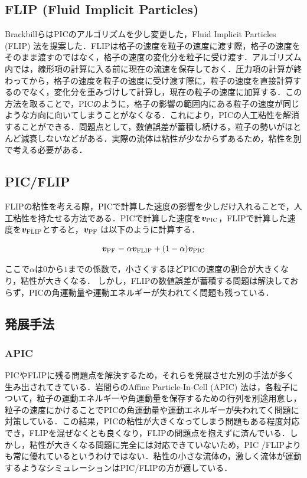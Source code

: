 \documentclass[a4j,12pt]{jreport}
\begin{document}
\subsection{FLIP (Fluid Implicit Particles) } \label{subsec:FLIP}
BrackbillらはPICのアルゴリズムを少し変更した，Fluid Implicit Particles (FLIP) 法\cite{FLIP}を提案した．FLIPは格子の速度を粒子の速度に渡す際，格子の速度をそのまま渡すのではなく，格子の速度の変化分を粒子に受け渡す．アルゴリズム内では，線形項の計算に入る前に現在の流速を保存しておく．圧力項の計算が終わってから，格子の速度を粒子の速度に受け渡す際に，粒子の速度を直接計算するのでなく，変化分を重みづけして計算し，現在の粒子の速度に加算する．この方法を取ることで，PICのように，格子の影響の範囲内にある粒子の速度が同じような方向に向いてしまうことがなくなる．これにより，PICの人工粘性を解消することができる．問題点として，数値誤差が蓄積し続ける，粒子の勢いがほとんど減衰しないなどがある．実際の流体は粘性が少なからずあるため，粘性を別で考える必要がある．
\subsection{PIC/FLIP} \label{subsec:PIC/FLIP}
FLIPの粘性を考える際，PICで計算した速度の影響を少しだけ入れることで，人工粘性を持たせる方法である．PICで計算した速度を$\bm{v}_{\rm{PIC}}$，FLIPで計算した速度を$\bm{v}_{\rm{FLIP}}$とすると，$\bm{v}_{\rm{PF}}$ は以下のように計算する．

\begin{equation}\label{eq:PIC/FLIP}
\bm{v}_{\rm{PF}} =\alpha \bm{v}_{\rm{FLIP}} + (1-\alpha)  \bm{v}_{\rm{PIC}}
\end{equation} 

ここで$\alpha$は$0$から$1$までの係数で，小さくするほどPICの速度の割合が大きくなり，粘性が大きくなる．
しかし，FLIPの数値誤差が蓄積する問題は解決しておらず，PICの角運動量や運動エネルギーが失われてく問題も残っている．

\subsection{発展手法} \label{subsec:APIC/ASFLIP}
\subsubsection{APIC} \label{subsec:APIC}
PICやFLIPに残る問題点を解決するため，それらを発展させた別の手法が多く生み出されてきている．岩間らのAffine Particle-In-Cell (APIC) 法\cite{APIC}は，各粒子について，粒子の運動エネルギーや角運動量を保存するための行列を別途用意し，粒子の速度にかけることでPICの角運動量や運動エネルギーが失われてく問題に対策している．この結果，PICの粘性が大きくなってしまう問題もある程度対応でき，FLIPを混ぜなくとも良くなり，FLIPの問題点を抱えずに済んでいる．しかし，粘性が大きくなる問題に完全には対応できていないため，PIC /FLIPよりも常に優れているというわけではない．粘性の小さな流体の，激しく流体が運動するようなシミュレーションはPIC/FLIPの方が適している．
\end{document}
